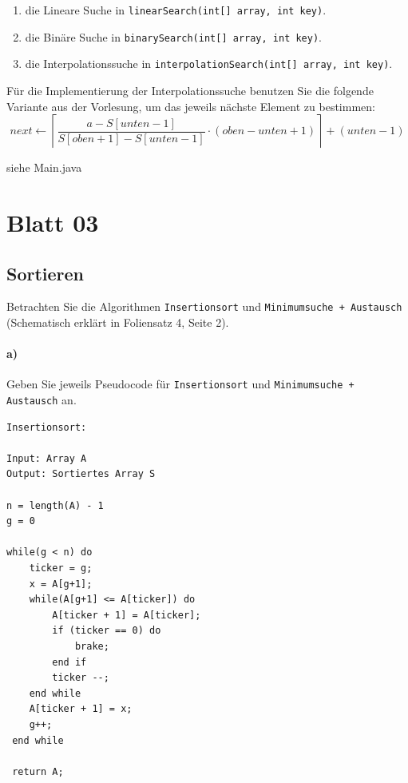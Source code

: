\documentclass[paper=a4, fontsize=11pt]{scrartcl}
\numberwithin{equation}{section}
\numberwithin{figure}{section}
\numberwithin{table}{section}
\begin{document}
\begin{enumerate}
\item die Lineare Suche in \texttt{linearSearch(int[] array, int key)}. 
\item die Binäre Suche in \texttt{binarySearch(int[] array, int key)}.
\item die Interpolationssuche in \texttt{interpolationSearch(int[] array, int key)}.
\end{enumerate}
Für die Implementierung der Interpolationssuche benutzen Sie die folgende Variante aus der Vorlesung, um das jeweils nächste Element zu bestimmen:
\[ next \leftarrow \left\lceil \frac{a-S[unten-1]}{S[oben+1]-S[unten-1]} \cdot (oben-unten+1) \right\rceil + (unten-1) \]

siehe Main.java

\newpage
\section{Blatt 03}
\subsection{Sortieren}
Betrachten Sie die Algorithmen \texttt{Insertionsort} und \texttt{Minimumsuche + Austausch} (Schematisch erklärt in Foliensatz 4, Seite 2).

\paragraph{a)}
Geben Sie jeweils Pseudocode für \texttt{Insertionsort} und \texttt{Minimumsuche + Austausch} an. \\

\begin{lstlisting}
Insertionsort:

Input: Array A
Output: Sortiertes Array S

n = length(A) - 1
g = 0

while(g < n) do
    ticker = g;
    x = A[g+1];
    while(A[g+1] <= A[ticker]) do
        A[ticker + 1] = A[ticker];
        if (ticker == 0) do
            brake;
        end if
        ticker --;
    end while
    A[ticker + 1] = x;
    g++;
 end while
 
 return A;

\end{lstlisting}
\end{document}
